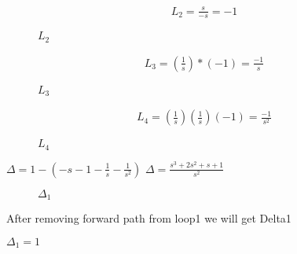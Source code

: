 \begin{enumerate}[label=\thesection.\arabic*.,ref=\thesection.\theenumi]
\begin{align}
L_2=\frac{s}{-s}=-1
\end{align}

\begin{figure}[!ht]
\begin{center}
		
		\resizebox{\columnwidth}{!}{}
	\end{center}
\caption{$L_2$}
\label{fig:sec_order}
\end{figure}


\begin{align}
L_3=(\frac{1}{s})*(-1)=\frac{-1}{s}
\end{align}

\begin{figure}[!ht]
\begin{center}
		
		\resizebox{\columnwidth}{!}{}
	\end{center}
\caption{$L_3$}
\label{fig:sec_order}
\end{figure}


\begin{align}
L_4=(\frac{1}{s})(\frac{1}{s})(-1)=\frac{-1}{s^2}
\end{align}

\begin{figure}[!ht]
\begin{center}
		
		\resizebox{\columnwidth}{!}{}
	\end{center}
\caption{$L_4$}
\label{fig:sec_order}
\end{figure}


$\Delta = 1-(-s-1-\frac{1}{s}-\frac{1}{s^2})$
$\Delta = \frac{s^3+2s^2+s+1}{s^2}$

\begin{figure}[!ht]
\begin{center}
		
		\resizebox{\columnwidth}{!}{}
	\end{center}
\caption{$\Delta_1$}
\label{fig:sec_order}
\end{figure}

After removing forward path from loop1 we will get Delta1

$\Delta_1 = 1$

\begin{figure}[!ht]
\begin{center}
		

\end{center}
\end{figure}
\end{enumerate}
